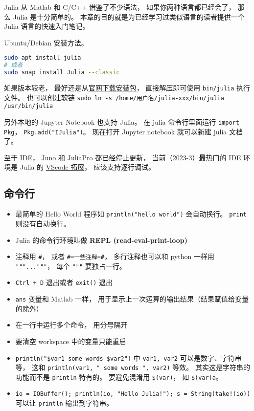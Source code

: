
Julia 从 Matlab 和 C/C++ 借鉴了不少语法， 如果你两种语言都已经会了， 那么 Julia 是十分简单的。 本章的目的就是为已经学习过类似语言的读者提供一个 Julia 语言的快速入门笔记。

Ubuntu/Debian 安装方法。
\begin{lstlisting}[language=bash]
sudo apt install julia
# 或者
sudo snap install Julia --classic
\end{lstlisting}
如果版本较老， 最好还是从\href{https://julialang.org/downloads}{官网下载安装包}， 直接解压即可使用 \verb`bin/julia` 执行文件。 也可以创建软链 \verb`sudo ln -s /home/用户名/julia-xxx/bin/julia /usr/bin/julia`

另外本地的 Jupyter Notebook 也支持 Julia。 在 julia 命令行里面运行 \verb`import Pkg`， \verb`Pkg.add("IJulia")`。 现在打开 Jupyter notebook 就可以新建 julia 文档了。

至于 IDE， Juno 和 JuliaPro 都已经停止更新， 当前（2023-3）最热门的 IDE 环境是 Julia 的 \href{https://www.julia-vscode.org}{VScode 拓展}， 应该支持逐行调试。

\subsection{命令行}
\begin{itemize}
\item 最简单的 Hello World 程序如 \verb`println("hello world")` 会自动换行。 \verb`print` 则没有自动换行。
\item Julia 的命令行环境叫做 \textbf{REPL (read-eval-print-loop)}
\item 注释用 \verb`#`， 或者 \verb`#=一些注释=#`， 多行注释也可以和 python 一样用 \verb`"""..."""`， 每个 \verb`"""` 要独占一行。
\item \verb`Ctrl + D` 退出或者 \verb`exit()` 退出
\item \verb`ans` 变量和 Matlab 一样， 用于显示上一次运算的输出结果（结果赋值给变量的除外）
\item 在一行中运行多个命令， 用分号隔开
\item 要清空 workspace 中的变量只能重启
\item \verb`println("$var1 some words $var2")` 中 \verb`var1, var2` 可以是数字、字符串等， 这和 \verb`println(var1, " some words ", var2)` 等效。 其实这是字符串的功能而不是 \verb`println` 特有的。 要避免混淆用 \verb`$(var)`， 如 \verb`$(var)a`。
\item \verb`io = IOBuffer(); println(io, "Hello Julia!"); s = String(take!(io))` 可以让 \verb`println` 输出到字符串。
\end{itemize}

